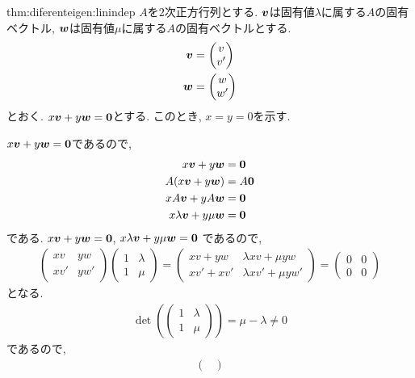 \begin{proofof}{thm:diferenteigen:linindep}
  $A$を$2$次正方行列とする.
  $\boldsymbol{v}$は固有値$\lambda$に属する$A$の固有ベクトル,
  $\boldsymbol{w}$は固有値$\mu$に属する$A$の固有ベクトルとする.
  \begin{align*}
    \boldsymbol{v}&=
    \begin{pmatrix}
      v\\v' 
    \end{pmatrix}\\
    \boldsymbol{w}&=
    \begin{pmatrix}
      w\\w' 
    \end{pmatrix}
  \end{align*}
  とおく.
  $x\boldsymbol{v}+y\boldsymbol{w}=\boldsymbol{0}$とする.
  このとき, $x=y=0$を示す.

  $x\boldsymbol{v}+y\boldsymbol{w}=\boldsymbol{0}$であるので,
  \begin{align*}
    x\boldsymbol{v}+y\boldsymbol{w}&=\boldsymbol{0}\\
    A(x\boldsymbol{v}+y\boldsymbol{w})&=A\boldsymbol{0}\\
    xA\boldsymbol{v}+yA\boldsymbol{w}&=\boldsymbol{0}\\
    x\lambda \boldsymbol{v}+y\mu \boldsymbol{w}&=\boldsymbol{0}
  \end{align*}
  である.
  $x\boldsymbol{v}+y\boldsymbol{w}=\boldsymbol{0}$, $x\lambda \boldsymbol{v}+y\mu \boldsymbol{w}=\boldsymbol{0}$
  であるので,
  \begin{align*}
    \begin{pmatrix}
      xv&yw\\xv'&yw' 
    \end{pmatrix}
    \begin{pmatrix}
      1&\lambda\\1&\mu 
    \end{pmatrix}
    =
    \begin{pmatrix}
      xv+yw&\lambda xv+\mu yw\\xv'+xv'&\lambda xv'+\mu yw' 
    \end{pmatrix}
    =
    \begin{pmatrix}
      0&0\\0&0
    \end{pmatrix}
  \end{align*}
  となる.
  \begin{align*}
    \det(
    \begin{pmatrix}
      1&\lambda\\1&\mu 
    \end{pmatrix})
    =\mu-\lambda\neq 0
  \end{align*}
  であるので,
  \begin{align*}
    \begin{pmatrix}

\end{pmatrix}
\end{align*}
\end{proofof}
